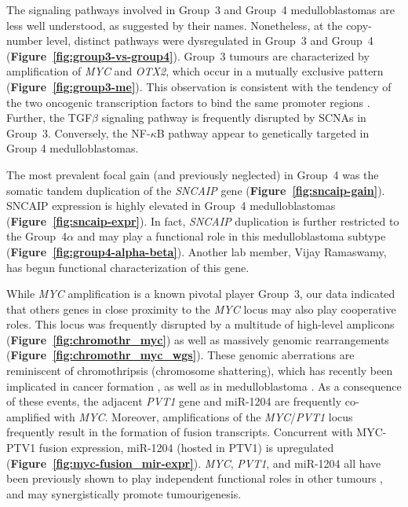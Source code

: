\documentclass[11pt,letterpaper]{article}
\theoremstyle{definition}
\begin{document}
The signaling pathways involved in Group~3 and Group~4 medulloblastomas are less well understood, as suggested by their names. Nonetheless, at the copy-number level, distinct pathways were dysregulated in Group~3 and Group~4 (\textbf{Figure~\ref{fig:group3-vs-group4}}). Group~3 tumours are characterized by amplification of \emph{MYC} and \emph{OTX2}, which occur in a mutually exclusive pattern (\textbf{Figure~\ref{fig:group3-me}}). This observation is consistent with the tendency of the two oncogenic transcription factors to bind the same promoter regions . Further, the TGF$\beta$ signaling pathway is frequently disrupted by SCNAs in Group~3. Conversely, the NF-$\kappa$B pathway appear to genetically targeted in Group 4 medulloblastomas.

The most prevalent focal gain (and previously neglected) in Group~4 was the somatic tandem duplication of the \emph{SNCAIP} gene (\textbf{Figure~\ref{fig:sncaip-gain}}). SNCAIP expression is highly elevated in Group~4 medulloblastomas (\textbf{Figure~\ref{fig:sncaip-expr}}). In fact, \emph{SNCAIP} duplication is further restricted to the Group~4$\alpha$ and may play a functional role in this medulloblastoma subtype (\textbf{Figure~\ref{fig:group4-alpha-beta}}). Another lab member, Vijay Ramaswamy, has begun functional characterization of this gene.

While \emph{MYC} amplification is a known pivotal player Group~3, our data indicated that others genes in close proximity to the \emph{MYC} locus may also play cooperative roles. This locus was frequently disrupted by a multitude of high-level amplicons (\textbf{Figure~\ref{fig:chromothr_myc}}) as well as massively genomic rearrangements (\textbf{Figure~\ref{fig:chromothr_myc_wgs}}). These genomic aberrations are reminiscent of chromothripsis (chromosome shattering), which has recently been implicated in cancer formation , as well as in medulloblastoma . As a consequence of these events, the adjacent \emph{PVT1} gene and miR-1204 are frequently co-amplified with \emph{MYC}. Moreover, amplifications of the \emph{MYC}/\emph{PVT1} locus frequently result in the formation of fusion transcripts. Concurrent with MYC-PTV1 fusion expression, miR-1204 (hosted in PTV1) is upregulated (\textbf{Figure~\ref{fig:myc-fusion_mir-expr}}). \emph{MYC}, \emph{PVT1}, and miR-1204 all have been previously shown to play independent functional roles in other tumours , and may synergistically promote tumourigenesis.
\end{document}
